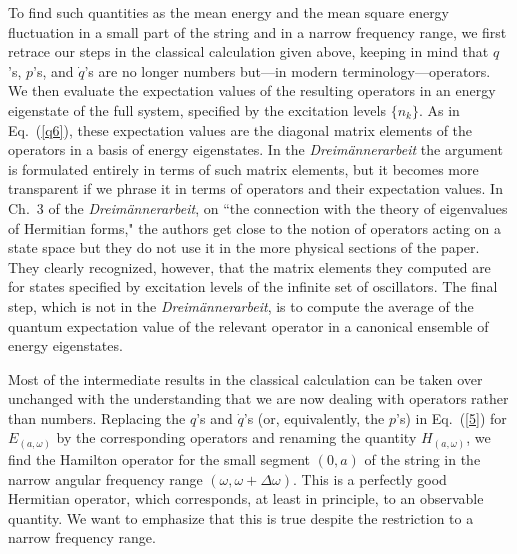 \documentclass[12pt]{elsart}
\begin{document}
To find such quantities as the mean energy and the mean square energy fluctuation in a small part of the string and in a narrow frequency range, we first retrace our steps in the classical calculation given above, keeping in mind that $q$'s, $p$'s, and $\dot{q}$'s are no longer numbers but---in modern terminology---operators. We then evaluate the expectation values of the resulting operators in an energy eigenstate of the full system, specified by the excitation levels $\{n_k\}$. As in Eq.\ (\ref{q6}), these expectation values are the diagonal matrix elements of the operators  in a basis of energy eigenstates. In the {\it Dreim\"annerarbeit}  the argument is formulated entirely in terms of such matrix elements, but  it becomes more transparent if we phrase it in terms of operators and their expectation values. In Ch.\ 3 of the {\it Dreim\"annerarbeit}, on ``the connection with the theory of eigenvalues of Hermitian forms,"  the authors get close to the notion of operators acting on a state space but they do not use it in the more physical sections of the paper. They clearly recognized, however, that the matrix elements they computed are for states specified by excitation levels of the infinite set of  oscillators. The final step, which is not in the {\it Dreim\"annerarbeit}, is to compute the average of the quantum expectation value of the relevant operator in a canonical ensemble of energy eigenstates.

Most of the intermediate results in the classical calculation can be taken over unchanged with the understanding that we are now dealing with operators rather than numbers. Replacing the $q$'s and $\dot{q}$'s (or, equivalently, the $p$'s) in Eq.\ (\ref{5}) for $E_{(a, \omega)}$ by the corresponding operators and renaming the quantity  $H_{(a, \omega)}$, we find the Hamilton operator for the small segment $(0, a)$ of the string in the narrow angular frequency range $(\omega, \omega + \Delta \omega)$. This is a perfectly good Hermitian operator, which corresponds, at least in principle, to an observable quantity. We want to emphasize that this is true despite the restriction to a narrow frequency range. 
\end{document}
